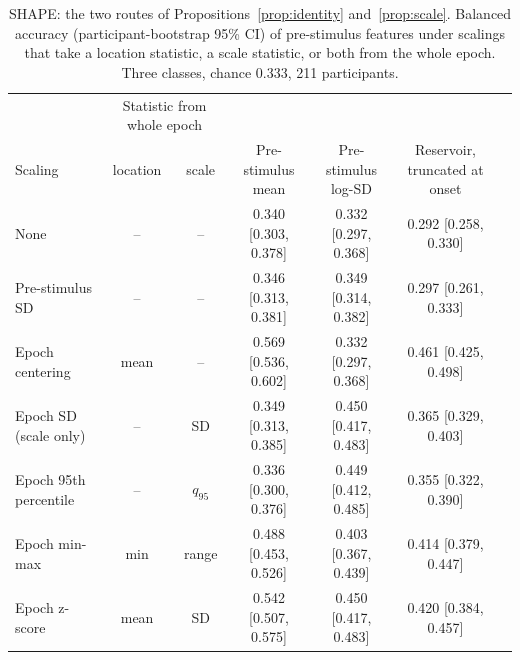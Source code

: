 \begin{table}[t]
\centering
\caption{SHAPE: the two routes of Propositions~\ref{prop:identity} and~\ref{prop:scale}. Balanced accuracy (participant-bootstrap 95\% CI) of pre-stimulus features under scalings that take a location statistic, a scale statistic, or both from the whole epoch. Three classes, chance 0.333, 211 participants.}
\label{tab:routes}
\begin{tabular}{lcccccc}
\toprule
 & \multicolumn{2}{c}{Statistic from whole epoch} & & & \\
Scaling & location & scale & Pre-stimulus mean & Pre-stimulus log-SD & Reservoir, truncated at onset \\
\midrule
None & -- & -- & 0.340 [0.303, 0.378] & 0.332 [0.297, 0.368] & 0.292 [0.258, 0.330] \\
Pre-stimulus SD & -- & -- & 0.346 [0.313, 0.381] & 0.349 [0.314, 0.382] & 0.297 [0.261, 0.333] \\
Epoch centering & mean & -- & 0.569 [0.536, 0.602] & 0.332 [0.297, 0.368] & 0.461 [0.425, 0.498] \\
Epoch SD (scale only) & -- & SD & 0.349 [0.313, 0.385] & 0.450 [0.417, 0.483] & 0.365 [0.329, 0.403] \\
Epoch 95th percentile & -- & $q_{95}$ & 0.336 [0.300, 0.376] & 0.449 [0.412, 0.485] & 0.355 [0.322, 0.390] \\
Epoch min-max & min & range & 0.488 [0.453, 0.526] & 0.403 [0.367, 0.439] & 0.414 [0.379, 0.447] \\
Epoch z-score & mean & SD & 0.542 [0.507, 0.575] & 0.450 [0.417, 0.483] & 0.420 [0.384, 0.457] \\
\bottomrule
\end{tabular}
\end{table}
